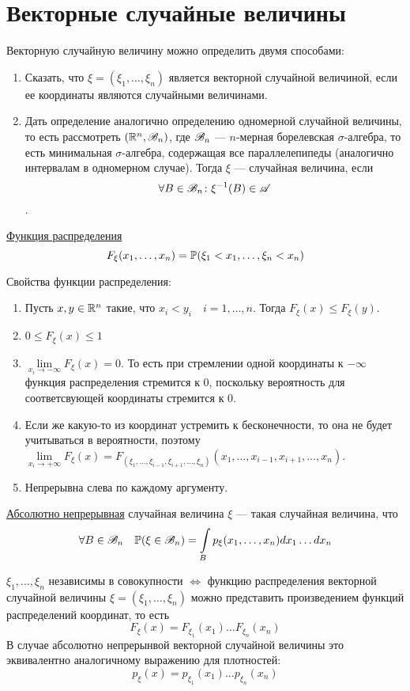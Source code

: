 \documentclass[../TV&MS.tex]{subfiles}
\begin{document}
    
\section{Векторные случайные величины}
Векторную случайную величину можно определить двумя способами:
\begin{enumerate}
	\item Сказать, что $\xi = (\xi_1, \ldots, \xi_n)$ является векторной случайной величиной, если ее координаты являются случайными величинами.
	\item Дать определение аналогично определению одномерной случайной величины, то есть рассмотреть $(\mathbb{R}^n, \mathscr{B}_n)$, где $\mathscr{B}_n$ --- $n$-мерная борелевская
	$\sigma$-алгебра, то есть минимальная $\sigma$-алгебра, содержащая все параллелепипеды (аналогично интервалам в одномерном случае). Тогда $\xi$ --- случайная величина, если $$\forall B \in \mathscr{B}_n \colon \xi^{-1}(B) \in \mathscr{A}$$. 
\end{enumerate}

\begin{Def}
\underline{Функция распределения} $$F_\xi(x_1, \ldots, x_n) = \mathbb{P}(\xi_1 < x_1, \ldots, \xi_n < x_n)$$
\end{Def}

Свойства функции распределения:
\begin{enumerate}
	\item Пусть $x, y \in \mathbb{R}^n$ такие, что $x_i < y_i \quad i = 1, \ldots, n$. Тогда $F_\xi(x) \le F_\xi(y)$.
	\item $0 \le F_\xi(x) \le 1$
	\item $\lim\limits_{x_i \to -\infty} F_\xi(x) = 0$. То есть при стремлении одной координаты к $-\infty$ функция распределения стремится к 0, поскольку вероятность для соответсвующей координаты стремится к 0.
	\item Если же какую-то из координат устремить к бесконечности, то она не будет учитываться в вероятности, поэтому 
	$\lim\limits_{x_i \to +\infty} F_\xi(x) = F_{(\xi_1, \ldots, \xi_{i-1}, \xi_{i+1}, \ldots, \xi_n)}(x_1, \ldots, x_{i-1}, x_{i+1}, \ldots, x_n)$.
	\item Непрерывна слева по каждому аргументу.
\end{enumerate}

\begin{Def}
\underline{Абсолютно непрерывная} случайная величина $\xi$ --- такая случайная величина, что
$$\forall B \in \mathscr{B}_n \quad \mathbb{P}(\xi \in \mathscr{B}_n) = \int\limits_B p_\xi(x_1, \ldots, x_n)dx_1\ldots dx_n$$ 
\end{Def}

$\xi_1, \ldots, \xi_n$ независимы в совокупности $\Leftrightarrow$ функцию распределения векторной случайной величины $\xi = (\xi_1, \ldots, \xi_n)$ можно представить произведением функций распределений координат, то есть 
$$F_\xi(x) = F_{\xi_1}(x_1)\ldots F_{\xi_n}(x_n)$$
В случае абсолютно непрерынвой векторной случайной величины это эквивалентно аналогичному выражению для плотностей:
$$p_\xi(x) = p_{\xi_1}(x_1)\ldots p_{\xi_n}(x_n)$$

\newpage
\end{document}
